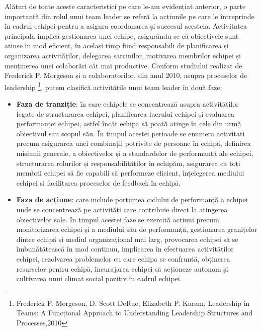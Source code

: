 \documentclass[a4paper, 12pt]{article}
\begin{document}
	\quad\space Alături de toate aceste caracteristici pe care le-am evidențiat anterior, o parte importantă din rolul unui team leader se referă la acțiunile pe care le întreprinde în cadrul echipei pentru a asigura coordonarea și succesul acesteia. Activitatea principala implică gestionarea unei echipe, asigurându-se că obiectivele sunt atinse în mod eficient, în același timp fiind responsabili de planificarea și organizarea activităților, delegarea sarcinilor, motivarea membrilor echipei și menținerea unei colaborări cât mai productive. Conform studiului realizat de Frederick P. Morgeson și a colaboratorilor, din anul 2010, asupra proceselor de leadership \footnote{Frederick P. Morgeson, D. Scott DeRue, Elizabeth P. Karam, Leadership în Teams: A Funcțional Approach to Understanding Leadership Structures and Processes,2010}, putem clasifică activitățile unui team leader în două faze: 
	\begin{itemize}

	\item \textbf{Faza de tranziție}: în care echipele se concentrează asupra activităților legate de structurarea echipei, planificarea lucrului echipei și evaluarea performanței echipei, astfel încât echipa să poată atinge în cele din urmă obiectivul sau scopul său. În timpul acestei perioade  se enumera activitati precum asigurarea unei combinații potrivite de persoane în echipă, definirea misiunii generale, a obiectivelor și a standardelor de performanță ale echipei, structurarea rolurilor și responsabilităților în echipăm, asigurarea ca toți membrii echipei să fie capabili să performeze eficient, înțelegerea mediului echipei si facilitarea proceselor de feedback în echipă. 

	\item \textbf{Faza de acțiune}: care include porțiunea ciclului de performanță a echipei unde se concentrează pe activități care contribuie direct la atingerea obiectivelor sale. In timpul acestei faze se exercită actiuni precum monitorizarea echipei și a mediului său de performanță, gestionarea granițelor dintre echipă și mediul organizațional mai larg, provocarea echipei să se îmbunătățească în mod continuu, implicarea în efectuarea activităților echipei, rezolvarea problemelor cu care echipa se confruntă, obținerea resurselor pentru echipă, încurajarea echipei să acționeze autonom și cultivarea unui climat social pozitiv în cadrul echipei. 
	\end{itemize}

\quad\space 
\end{document}
